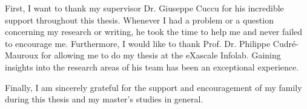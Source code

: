
First, I want to thank my supervisor Dr. Giuseppe Cuccu for his incredible support throughout this thesis. Whenever I had a problem or a question concerning my research or writing, he took the time to help me and never failed to encourage me. Furthermore, I would like to thank Prof. Dr. Philippe Cudré-Mauroux for allowing me to do my thesis at the eXascale Infolab. Gaining insights into the research areas of his team has been an exceptional experience.

Finally, I am sincerely grateful for the support and encouragement of my family during this thesis and my master's studies in general.
